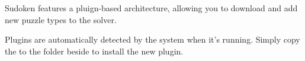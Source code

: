 Sudoken features a pluign-based architecture, allowing you to download and add new puzzle types to the solver. 

Plugins are automatically detected by the system when it's running. Simply copy the  to the  folder beside  to install the new plugin.